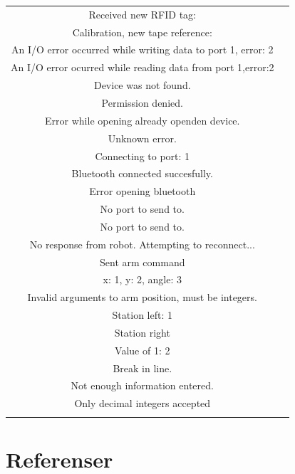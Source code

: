 \documentclass[a4paper,12pt]{article}
\begin{document}
\begin{longtable}{|c|c|}
        Received new RFID tag:  & \\
        Calibration, new tape reference:  & \\
        An I/O error occurred while writing data to port 1, error: 2 & \\
        An I/O error ocurred while reading data from port 1,error:2 & \\
        Device was not found. & \\
        Permission denied. & \\
        Error while opening already openden device. & \\
        Unknown error. & \\
        Connecting to port: 1 & \\
        Bluetooth connected succesfully. & \\
        Error opening bluetooth & \\
        No port to send to. & \\
        No port to send to. & \\
        No response from robot. Attempting to reconnect... & \\
        Sent arm command & \\
        x: 1, y: 2, angle: 3 & \\
        Invalid arguments to arm position, must be integers. & \\
        Station left: 1 & \\
        Station right & \\
        Value of 1: 2 & \\
        Break in line. & \\
        Not enough information entered. & \\
        Only decimal integers accepted & \\
\label{tab:logg}
\end{longtable}


\newpage
\section*{Referenser}


\newpage
\appendix
\end{document}
